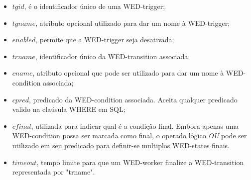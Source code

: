 \documentclass[conference]{IEEEtran}
\begin{document}
\begin{itemize}
\item $tgid$, é o identificador único de uma WED-trigger;
\item $tgname$, atributo opcional utilizado para dar um nome à WED-trigger;
\item $enabled$, permite que a WED-trigger seja desativada;
\item $trname$, identificador único da WED-transition associada.
\item $cname$, atributo opcional que pode ser utilizado para dar um nome à WED-condition associada;
\item $cpred$, predicado da WED-condition associada. Aceita qualquer predicado valido na claúsula WHERE em SQL;
\item $cfinal$, utilizada para indicar qual é a condição final. Embora apenas uma WED-condition possa ser marcada como final,
           o operado lógico \emph{OU} pode ser utilizado em seu predicado para definir-se multiplos WED-states finais.
\item $timeout$, tempo limite para que um WED-worker finalize a WED-transition representada por "trname".

\end{itemize}
\end{document}
